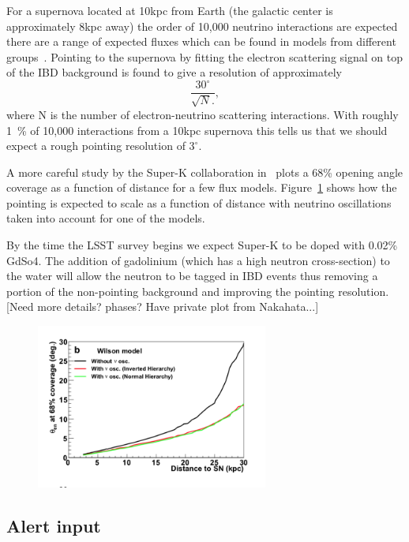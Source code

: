 \documentclass[11pt]{article}
\newcommand{\superk}  {Super\nobreakdash-K\xspace}
\begin{document}
For a supernova located at 10kpc from Earth (the galactic center is
approximately 8kpc away) the order of 10,000 neutrino interactions are
expected there are a range of expected fluxes which can be found in
models from different groups~\cite{model_references}.  Pointing to the
supernova by fitting the electron scattering signal on top of the IBD
background is found to give a resolution of approximately
%
$$ \frac{30^\circ}{\sqrt{N}.}, $$
%
where N is the number of electron-neutrino scattering interactions.
With roughly 1~\% of 10,000 interactions from a 10kpc supernova this
tells us that we should expect a rough pointing resolution of $3^\circ$.

A more careful study by the \superk collaboration
in~\cite{2016APh....81...39A} plots a 68\% opening angle coverage as a
function of distance for a few flux
models. Figure~\ref{fig:SK-realtime-pointing-resolution} shows how the
pointing is expected to scale as a function of distance with neutrino
oscillations taken into account for one of the models.

By the time the LSST survey begins we expect \superk to be doped with
0.02\% GdSo4.  The addition of gadolinium (which has a high neutron
cross-section) to the water will allow the neutron to be tagged in IBD
events thus removing a portion of the non-pointing background and
improving the pointing resolution. [Need more details? phases? Have
private plot from Nakahata...]

\begin{figure}
  \begin{center}
    \includegraphics[width=3.0in]{SK-realtime-pointing-resolution}
    \caption{}
    \label{fig:SK-realtime-pointing-resolution}
  \end{center}
\end{figure}

\subsection{Alert input}
\end{document}
